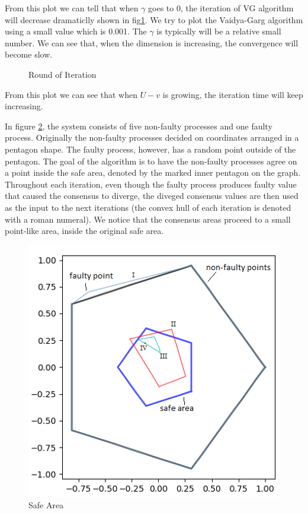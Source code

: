 From this plot we can tell that when $\gamma$ goes to 0, the iteration
of VG algorithm will decrease dramaticlly shown in fig\ref{fig:M4}. We
try to plot the Vaidya-Garg algorithm using a small value which is 0.001.
The $\gamma$ is typically will be a relative small number. We can see
that, when the dimension is increasing, the convergence will become slow.

\begin{figure}

\caption{Round of Iteration} \label{fig:M4}
\end{figure}

From this plot we can see that when $U - v$ is growing, the iteration
time will keep increasing. 


In figure \ref{fig:M5}, the system consists of five non-faulty processes and one 
faulty process. Originally the non-faulty processes decided on coordinates 
arranged in a pentagon shape. The faulty process, however, has a 
random point outside of the pentagon. The goal of the algorithm is 
to have the non-faulty processes agree on a point inside the safe area,
denoted by the marked inner pentagon on the graph. Throughout each 
iteration, even though the faulty process produces faulty value that 
caused the consensus to diverge, the diveged consensus values are 
then used as the input to the next iterations (the convex hull of 
each iteration is denoted with a roman numeral). We notice that the 
consensus areas proceed to a small point-like area, inside the original 
safe area.

\begin{figure}
\includegraphics[scale=0.5]{p1}

\caption{Safe Area} \label{fig:M5}
\end{figure}

